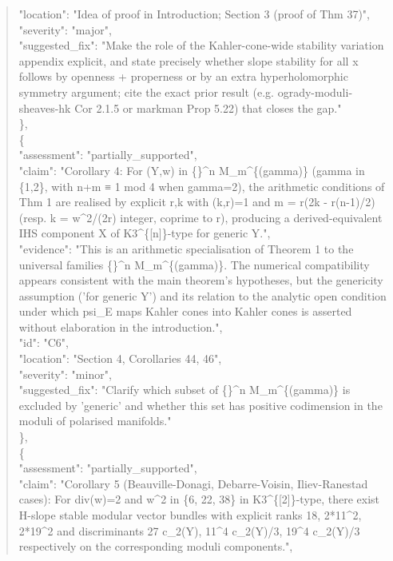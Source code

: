 \documentclass[11pt]{article}
\begin{document}
\begin{quote}
      "location": "Idea of proof in Introduction; Section 3 (proof of Thm 37)",\\
      "severity": "major",\\
      "suggested\_fix": "Make the role of the Kahler-cone-wide stability variation appendix explicit, and state precisely whether slope stability for all x follows by openness + properness or by an extra hyperholomorphic symmetry argument; cite the exact prior result (e.g. ogrady-moduli-sheaves-hk Cor 2.1.5 or markman Prop 5.22) that closes the gap."\\
    \},\\
    \{\\
      "assessment": "partially\_supported",\\
      "claim": "Corollary 4: For (Y,w) in \{\}\^{}n M\_m\^{}\{(gamma)\} (gamma in \{1,2\}, with n+m ≡ 1 mod 4 when gamma=2), the arithmetic conditions of Thm 1 are realised by explicit r,k with (k,r)=1 and m = r(2k - r(n-1)/2) (resp. k = w\^{}2/(2r) integer, coprime to r), producing a derived-equivalent IHS component X of K3\^{}\{[n]\}-type for generic Y.",\\
      "evidence": "This is an arithmetic specialisation of Theorem 1 to the universal families \{\}\^{}n M\_m\^{}\{(gamma)\}. The numerical compatibility appears consistent with the main theorem's hypotheses, but the genericity assumption ('for generic Y') and its relation to the analytic open condition under which psi\_E maps Kahler cones into Kahler cones is asserted without elaboration in the introduction.",\\
      "id": "C6",\\
      "location": "Section 4, Corollaries 44, 46",\\
      "severity": "minor",\\
      "suggested\_fix": "Clarify which subset of \{\}\^{}n M\_m\^{}\{(gamma)\} is excluded by 'generic' and whether this set has positive codimension in the moduli of polarised manifolds."\\
    \},\\
    \{\\
      "assessment": "partially\_supported",\\
      "claim": "Corollary 5 (Beauville-Donagi, Debarre-Voisin, Iliev-Ranestad cases): For div(w)=2 and w\^{}2 in \{6, 22, 38\} in K3\^{}\{[2]\}-type, there exist H-slope stable modular vector bundles with explicit ranks 18, 2*11\^{}2, 2*19\^{}2 and discriminants 27 c\_2(Y), 11\^{}4 c\_2(Y)/3, 19\^{}4 c\_2(Y)/3 respectively on the corresponding moduli components.",\\

\end{quote}
\end{document}
